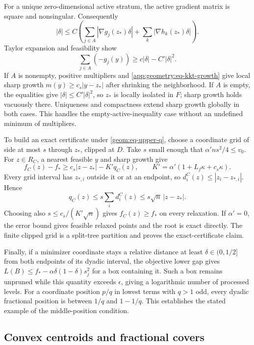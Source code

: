 For a unique zero-dimensional active stratum, the active gradient
matrix is square and nonsingular. Consequently
\[
 |\delta|\leq C\left(\sum_{j\in A}|\nabla g_j(z_*)\delta|
                  +\sum_k|\nabla h_k(z_*)\delta|\right).
\]
Taylor expansion and feasibility show
\[
 \sum_{j\in A}(-g_j(y))\geq c|\delta|-C'|\delta|^2.
\]
If $A$ is nonempty, positive multipliers and
\cref{app:geometry:eq-kkt-growth} give local sharp growth
$m(y)\geq c_s|y-z_*|$ after shrinking the neighborhood. If $A$ is
empty, the equalities give $|\delta|\leq C'|\delta|^2$, so $z_*$ is
locally isolated in $F$; sharp growth holds vacuously there.
Uniqueness and compactness extend sharp growth globally in both cases.
This handles the empty-active-inequality case without an undefined
minimum of multipliers.

To build an exact certificate under \cref{geom:eq-upper-q}, choose a
coordinate grid of side at most $s$ through $z_*$, clipped at $D$.
Take $s$ small enough that $\alpha'ns^2/4\leq v_0$.
For $z\in R_C$, a nearest feasible $y$ and sharp growth give
\[
 f_C(z)-f_*
 \geq c_s|z-z_*|-K'q_C(z),\qquad
 K'=\alpha'(1+L_f\kappa+c_s\kappa).
\]
Every grid interval has $z_{*,i}$ outside it or at an endpoint, so
$d_i^C(z)\leq|z_i-z_{*,i}|$. Hence
\[
 q_C(z)\leq s\sum_i d_i^C(z)
                  \leq s\sqrt n\,|z-z_*|.
\]
Choosing also $s\leq c_s/(K'\sqrt n)$ gives $f_C(z)\geq f_*$ on
every relaxation. If $\alpha'=0$, the error bound gives feasible
relaxed points and the root is exact directly. The finite clipped
grid is a split-tree partition and proves the exact-certificate claim.

Finally, if a minimizer coordinate stays a relative distance at least
$\delta\in(0,1/2]$ from both endpoints of its dyadic interval, the
objective lower gap gives
$L(B)\leq f_*-\alpha\delta(1-\delta)s_j^2$ for a box containing it.
Such a box remains unpruned while this quantity exceeds $\epsilon$,
giving a logarithmic number of processed levels. For a coordinate
position $p/q$ in lowest terms with $q>1$ odd, every dyadic fractional
position is between $1/q$ and $1-1/q$. This establishes the stated
example of the middle-position condition.

\subsection{Convex centroids and fractional covers}

